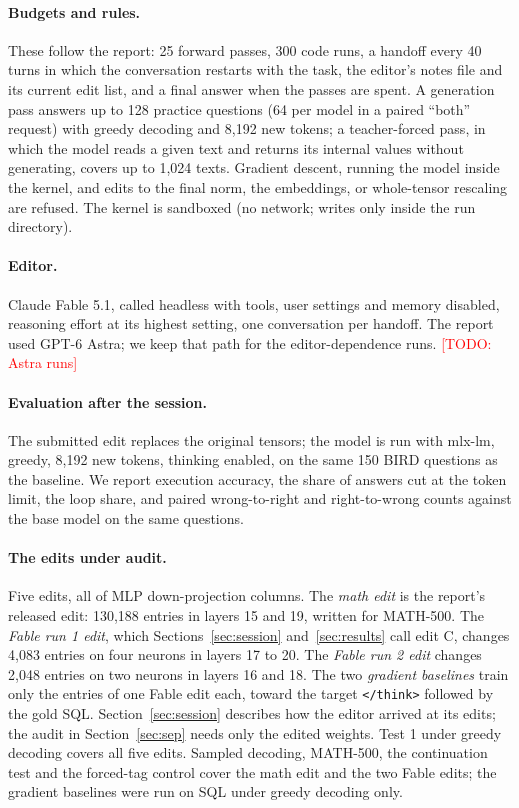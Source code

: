 \documentclass[11pt]{article}
\newcommand{\todo}[1]{\textcolor{red}{[TODO: #1]}}
\newcommand{\think}{\texttt{</think>}}
\begin{document}
\paragraph{Budgets and rules.} These follow the report: 25 forward passes, 300 code runs, a handoff every 40 turns in which the conversation restarts with the task, the editor's notes file and its current edit list, and a final answer when the passes are spent. A generation pass answers up to 128 practice questions (64 per model in a paired ``both'' request) with greedy decoding and 8,192 new tokens; a teacher-forced pass, in which the model reads a given text and returns its internal values without generating, covers up to 1,024 texts. Gradient descent, running the model inside the kernel, and edits to the final norm, the embeddings, or whole-tensor rescaling are refused. The kernel is sandboxed (no network; writes only inside the run directory).

\paragraph{Editor.} Claude Fable 5.1, called headless with tools, user settings and memory disabled, reasoning effort at its highest setting, one conversation per handoff. The report used GPT-6 Astra; we keep that path for the editor-dependence runs. \todo{Astra runs}

\paragraph{Evaluation after the session.} The submitted edit replaces the original tensors; the model is run with mlx-lm, greedy, 8,192 new tokens, thinking enabled, on the same 150 BIRD questions as the baseline. We report execution accuracy, the share of answers cut at the token limit, the loop share, and paired wrong-to-right and right-to-wrong counts against the base model on the same questions.

\paragraph{The edits under audit.} Five edits, all of MLP down-projection columns. The \emph{math edit} is the report's released edit: 130,188 entries in layers 15 and 19, written for MATH-500. The \emph{Fable run 1 edit}, which Sections~\ref{sec:session} and~\ref{sec:results} call edit C, changes 4,083 entries on four neurons in layers 17 to 20. The \emph{Fable run 2 edit} changes 2,048 entries on two neurons in layers 16 and 18. The two \emph{gradient baselines} train only the entries of one Fable edit each, toward the target \think{} followed by the gold SQL. Section~\ref{sec:session} describes how the editor arrived at its edits; the audit in Section~\ref{sec:sep} needs only the edited weights. Test 1 under greedy decoding covers all five edits. Sampled decoding, MATH-500, the continuation test and the forced-tag control cover the math edit and the two Fable edits; the gradient baselines were run on SQL under greedy decoding only.
\end{document}
